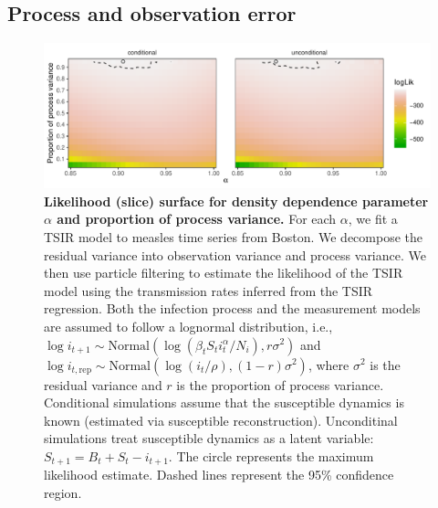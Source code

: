 \documentclass{article}
\begin{document}
\pagebreak
\subsection{Process and observation error}

\begin{figure}[!h]
\includegraphics[width=\textwidth]{../figure/compare_conditional_likelihood.pdf}
\caption{
\textbf{Likelihood (slice) surface for density dependence parameter $\alpha$ and proportion of process variance.}
For each $\alpha$, we fit a TSIR model to measles time series from Boston.
We decompose the residual variance into observation variance and process variance.
We then use particle filtering to estimate the likelihood of the TSIR model using the transmission rates inferred from the TSIR regression.
Both the infection process and the measurement models are assumed to follow a lognormal distribution, i.e., $\log i_{t+1} \sim \mathrm{Normal}(\log (\beta_t S_t i_t^\alpha/N_i), r \sigma^2)$ and $\log i_{t, \textrm{rep}} \sim \mathrm{Normal}(\log (i_{t}/\rho) , (1-r) \sigma^2)$, where $\sigma^2$ is the residual variance and $r$ is the proportion of process variance.
Conditional simulations assume that the susceptible dynamics is known (estimated via susceptible reconstruction).
Unconditinal simulations treat susceptible dynamics as a latent variable: $S_{t+1} = B_t + S_t - i_{t+1}$.
The circle represents the maximum likelihood estimate.
Dashed lines represent the 95\% confidence region.
}
\end{figure}
\end{document}
